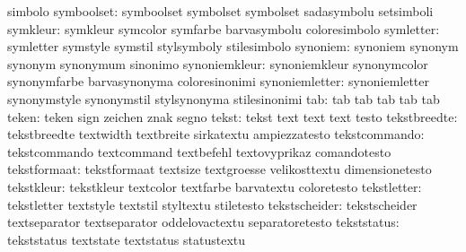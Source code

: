                            simbolo
               symboolset: symboolset                symbolset
                           symbolset                 sadasymbolu
                           setsimboli
                 symkleur: symkleur                  symcolor
                           symfarbe                  barvasymbolu
                           coloresimbolo
                symletter: symletter                 symstyle
                           symstil                   stylsymboly
                           stilesimbolo
                 synoniem: synoniem                  synonym
                           synonym                   synonymum
                           sinonimo
            synoniemkleur: synoniemkleur             synonymcolor
                           synonymfarbe              barvasynonyma
                           coloresinonimi
           synoniemletter: synoniemletter            synonymstyle
                           synonymstil               stylsynonyma
                           stilesinonimi
                      tab: tab                       tab
                           tab                       tab
                           tab
                    teken: teken                     sign
                           zeichen                   znak
                           segno
                    tekst: tekst                     text
                           text                      text
                           testo
             tekstbreedte: tekstbreedte              textwidth
                           textbreite                sirkatextu
                           ampiezzatesto
            tekstcommando: tekstcommando             textcommand
                           textbefehl                textovyprikaz
                           comandotesto
             tekstformaat: tekstformaat              textsize
                           textgroesse               velikosttextu
                           dimensionetesto
               tekstkleur: tekstkleur                textcolor
                           textfarbe                 barvatextu
                           coloretesto
              tekstletter: tekstletter               textstyle
                           textstil                  styltextu
                           stiletesto
            tekstscheider: tekstscheider             textseparator
                           textseparator             oddelovactextu
                           separatoretesto
              tekststatus: tekststatus               textstate
                           textstatus                statustextu
